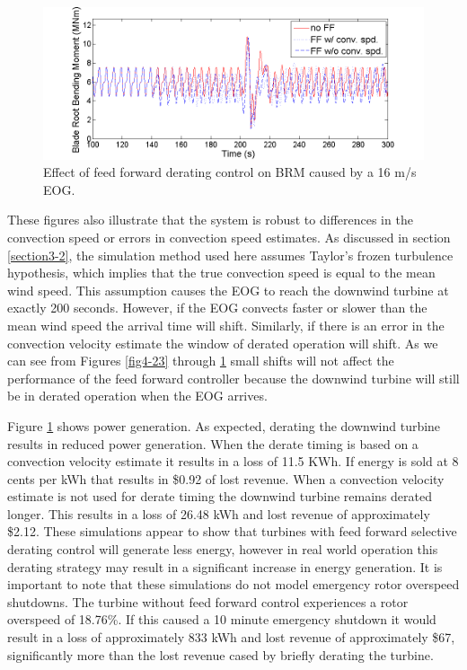 \begin{figure}[htb]
	\centering
		\includegraphics[width = \linewidth]{Figures/ch4Figures/fig4-25.png}
		
	\caption{Effect of feed forward derating control on BRM caused by a 16 m/s EOG.}
	\label{fig4-25}
\end{figure}



These figures also illustrate that the system is robust to differences in the convection speed or errors in convection speed estimates. As discussed in section \ref{section3-2}, the simulation method used here assumes Taylor's frozen turbulence hypothesis, which implies that the true convection speed is equal to the mean wind speed. This assumption causes the EOG to reach the downwind turbine at exactly 200 seconds. However, if the EOG convects faster or slower than the mean wind speed the arrival time will shift. Similarly, if there is an error in the convection velocity estimate the window of derated operation will shift. As we can see from Figures \ref{fig4-23} through \ref{fig4-25} small shifts will not affect the performance of the feed forward controller because the downwind turbine will still be in derated operation when the EOG arrives.

Figure \ref{fig4-25} shows power generation. As expected, derating the downwind turbine results in reduced power generation. When the derate timing is based on a convection velocity estimate it results in a loss of 11.5 KWh. If energy is sold at 8 cents per kWh that results in \$0.92 of lost revenue. When a convection velocity estimate is not used for derate timing the downwind turbine remains derated longer. This results in a loss of 26.48 kWh and lost revenue of approximately \$2.12. These simulations appear to show that turbines with feed forward selective derating control will generate less energy, however in real world operation this derating strategy may result in a significant increase in energy generation. It is important to note that these simulations do not model emergency rotor overspeed shutdowns. The turbine without feed forward control experiences a rotor overspeed of 18.76\%. If this caused a 10 minute emergency shutdown it would result in a loss of approximately 833 kWh and lost revenue of approximately \$67, significantly more than the lost revenue cased by briefly derating the turbine.

